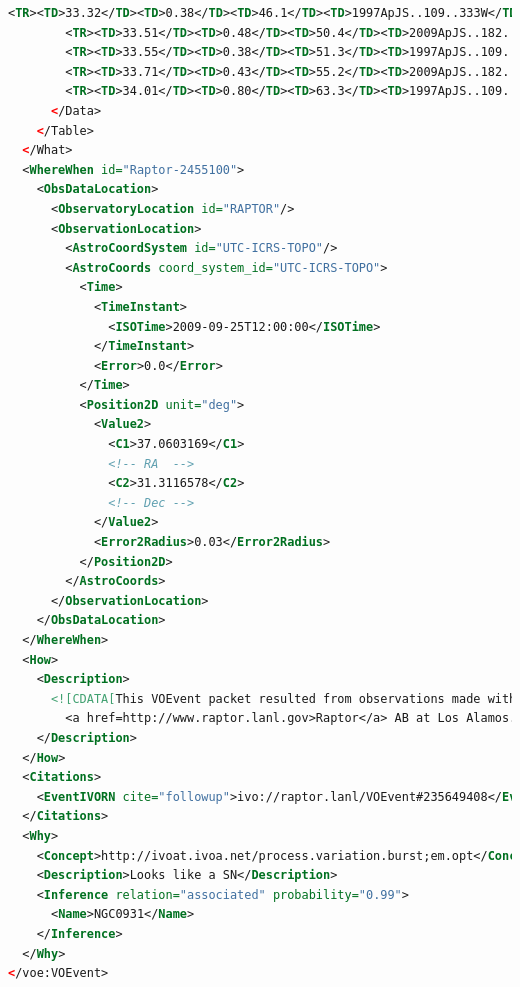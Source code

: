 \documentclass[11pt,a4paper]{ivoa}
\begin{document}
\begin{lstlisting}[language=XML]
        <TR><TD>33.32</TD><TD>0.38</TD><TD>46.1</TD><TD>1997ApJS..109..333W</TD></TR>
        <TR><TD>33.51</TD><TD>0.48</TD><TD>50.4</TD><TD>2009ApJS..182..474S</TD></TR>
        <TR><TD>33.55</TD><TD>0.38</TD><TD>51.3</TD><TD>1997ApJS..109..333W</TD></TR>
        <TR><TD>33.71</TD><TD>0.43</TD><TD>55.2</TD><TD>2009ApJS..182..474S</TD></TR>
        <TR><TD>34.01</TD><TD>0.80</TD><TD>63.3</TD><TD>1997ApJS..109..333W</TD></TR>
      </Data>
    </Table>
  </What>
  <WhereWhen id="Raptor-2455100">
    <ObsDataLocation>
      <ObservatoryLocation id="RAPTOR"/>
      <ObservationLocation>
        <AstroCoordSystem id="UTC-ICRS-TOPO"/>
        <AstroCoords coord_system_id="UTC-ICRS-TOPO">
          <Time>
            <TimeInstant>
              <ISOTime>2009-09-25T12:00:00</ISOTime>
            </TimeInstant>
            <Error>0.0</Error>
          </Time>
          <Position2D unit="deg">
            <Value2>
              <C1>37.0603169</C1>
              <!-- RA  -->
              <C2>31.3116578</C2>
              <!-- Dec -->
            </Value2>
            <Error2Radius>0.03</Error2Radius>
          </Position2D>
        </AstroCoords>
      </ObservationLocation>
    </ObsDataLocation>
  </WhereWhen>
  <How>
    <Description>
      <![CDATA[This VOEvent packet resulted from observations made with 
        <a href=http://www.raptor.lanl.gov>Raptor</a> AB at Los Alamos. ]]>
    </Description>
  </How>
  <Citations>
    <EventIVORN cite="followup">ivo://raptor.lanl/VOEvent#235649408</EventIVORN>
  </Citations>
  <Why>
    <Concept>http://ivoat.ivoa.net/process.variation.burst;em.opt</Concept>
    <Description>Looks like a SN</Description>
    <Inference relation="associated" probability="0.99">
      <Name>NGC0931</Name>
    </Inference>
  </Why>
</voe:VOEvent>
\end{lstlisting}
\end{document}
